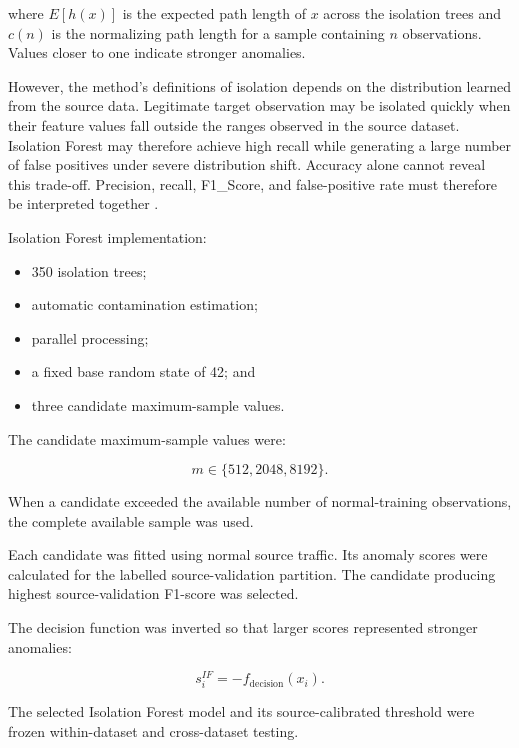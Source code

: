 where  \(E[h(x)]\) is the expected path length of \(x\)  across the isolation trees and \(c(n)\) is the normalizing path length for a sample containing \(n\)  observations.  Values closer to one indicate stronger anomalies.

However, the method's definitions of isolation depends on the distribution learned from the source data. Legitimate target observation may be isolated quickly when their feature values fall outside the ranges observed in the source dataset. 
Isolation Forest may therefore achieve high recall while generating a large number of false positives under severe distribution shift. Accuracy alone cannot reveal this trade-off. Precision, recall, F1\_Score, and false-positive rate must therefore be interpreted together \cite{Verkerken2022, Yang2022}.

Isolation Forest implementation:
\begin{itemize}
       \item 350 isolation trees;
       \item automatic contamination estimation;
       \item parallel processing;
       \item a fixed base random state of 42; and
       \item three candidate maximum-sample values.
\end{itemize}

The candidate maximum-sample values were:

\begin{equation}
       m \in \{512, 2048, 8192\}.
       \label{eq:if-sample-candidates}
\end{equation}

When a candidate exceeded the available number of normal-training observations, the complete available sample was used.

Each candidate was fitted using normal source traffic. Its anomaly scores were calculated for the labelled source-validation partition. The candidate producing highest source-validation F1-score was selected.

The decision function was inverted so that larger scores represented stronger anomalies:

\begin{equation}
       s_i^{IF} =
       -f_{\mathrm{decision}}(x_i).
       \label{eq:if-anomaly-score}
\end{equation}

The selected Isolation Forest model and its source-calibrated threshold were frozen within-dataset and cross-dataset testing.


